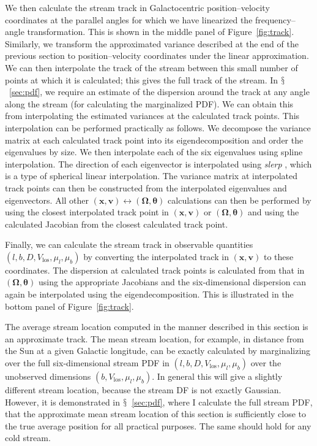 \documentclass{emulateapj}
\renewcommand{\figurename}{Figure}
\newcommand{\sectionname}{$\mathsection$}
\renewcommand{\vec}[1]{\ensuremath{\mathbf{#1}}}
\newcommand{\vecx}{\ensuremath{\vec{x}}}
\newcommand{\vecv}{\ensuremath{\vec{v}}}
\newcommand{\veco}{\ensuremath{\vec{\Omega}}}
\newcommand{\veca}{\ensuremath{\boldsymbol\theta}}
\newcommand{\vlos}{\ensuremath{V_{\mathrm{los}}}}
\newcommand{\pmll}{\ensuremath{\mu_l}}
\newcommand{\pmbb}{\ensuremath{\mu_b}}
\begin{document}
We then calculate the stream track in Galactocentric
position--velocity coordinates at the parallel angles for which we
have linearized the frequency--angle transformation. This is shown in
the middle panel of \figurename~\ref{fig:track}. Similarly, we
transform the approximated variance described at the end of the
previous section to position--velocity coordinates under the linear
approximation. We can then interpolate the track of the stream between
this small number of points at which it is calculated; this gives the
full track of the stream. In \sectionname~\ref{sec:pdf}, we require an
estimate of the dispersion around the track at any angle along the
stream (for calculating the marginalized PDF). We can obtain this from
interpolating the estimated variances at the calculated track
points. This interpolation can be performed practically as follows. We
decompose the variance matrix at each calculated track point into its
eigendecomposition and order the eigenvalues by size. We then
interpolate each of the six eigenvalues using spline
interpolation. The direction of each eigenvector is interpolated using
\emph{slerp} \citep{Shoemake85a}, which is a type of spherical linear
interpolation. The variance matrix at interpolated track points can
then be constructed from the interpolated eigenvalues and
eigenvectors. All other $(\vecx,\vecv) \leftrightarrow (\veco,\veca)$
calculations can then be performed by using the closest interpolated
track point in $(\vecx,\vecv)$ or $(\veco,\veca)$ and using the
calculated Jacobian from the closest calculated track point.

Finally, we can calculate the stream track in observable quantities
$(l,b,D,\vlos,\pmll,\pmbb)$ by converting the interpolated track in
$(\vecx,\vecv)$ to these coordinates. The dispersion at calculated
track points is calculated from that in $(\veco,\veca)$ using the
appropriate Jacobians and the six-dimensional dispersion can again be
interpolated using the eigendecomposition. This is illustrated in the
bottom panel of \figurename~\ref{fig:track}.

The average stream location computed in the manner described in this
section is an approximate track. The mean stream location, for
example, in distance from the Sun at a given Galactic longitude, can
be exactly calculated by marginalizing over the full six-dimensional
stream PDF in $(l,b,D,\vlos,\pmll,\pmbb)$ over the unobserved
dimensions $(b,\vlos,\pmll,\pmbb)$. In general this will give a
slightly different stream location, because the stream DF is not
exactly Gaussian. However, it is demonstrated in
\sectionname~\ref{sec:pdf}, where I calculate the full stream PDF,
that the approximate mean stream location of this section is
sufficiently close to the true average position for all practical
purposes. The same should hold for any cold stream.
\end{document}
